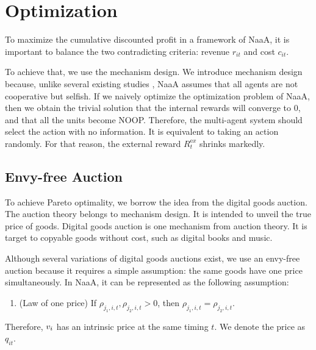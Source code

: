 \section{Optimization}
To maximize the cumulative discounted profit in a framework of NaaA,
it is important to balance the two contradicting criteria: revenue $r_{it}$ and cost $c_{it}$.


To achieve that, we use the mechanism design.
We introduce mechanism design because, unlike several existing studies \citep{sukhbaatar2016learning}, NaaA assumes that all agents are not cooperative but selfish.
If we naively optimize the optimization problem of NaaA, then we obtain the trivial solution that the internal rewards will converge to 0, and that all the units become NOOP.
Therefore, the multi-agent system should select the action with no information. It is equivalent to taking an action randomly.
For that reason, the external reward $R_t^{\mathrm ex}$ shrinks markedly.

\subsection{Envy-free Auction}
To achieve Pareto optimality, we borrow the idea from the digital goods auction.
The auction theory belongs to mechanism design. It is intended to unveil the true price of goods.
Digital goods auction is one mechanism from auction theory.
It is target to copyable goods without cost, such as digital books and music.

Although several variations of digital goods auctions exist,
we use an envy-free auction \citep{guruswami2005profit} because it requires a simple assumption: the same goods have one price simultaneously.
In NaaA, it can be represented as the following assumption:
\begin{enumerate}
\renewcommand{\labelenumi}{N\arabic{enumi}:}
\setcounter{enumi}{4}
\item (Law of one price)
	If $\rho_{j_1,i,t}, \rho_{j_2,i,t} > 0$, then $\rho_{j_1,i,t} = \rho_{j_2,i,t}$.
\end{enumerate}
Therefore, $v_{i}$ has an intrinsic price at the same timing $t$.
We denote the price as $q_{it}$.

